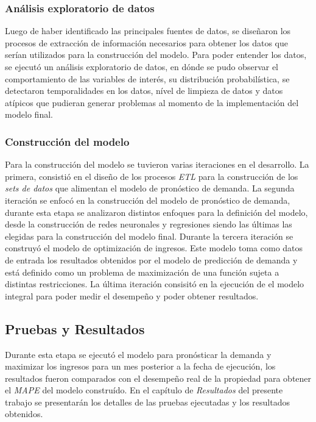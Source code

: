 \subsubsection*{Análisis exploratorio de datos}

Luego de haber identificado las principales fuentes de datos, se diseñaron los procesos de extracción de información necesarios para obtener los datos que serían utilizados para la construcción del modelo. Para poder entender los datos, se ejecutó un análisis exploratorio de datos, en dónde se pudo observar el comportamiento de las variables de interés, su distribución probabilística, se detectaron temporalidades en los datos, nível de limpieza de datos y datos atípicos que pudieran generar problemas al momento de la implementación del modelo final.

\subsubsection*{Construcción del modelo}

Para la construcción del modelo se tuvieron varias iteraciones en el desarrollo. La primera, consistió en el diseño de los procesos \emph{ETL} para la construcción de los \emph{sets de datos} que alimentan el modelo de pronóstico de demanda. La segunda iteración se enfocó en la construcción del modelo de pronóstico de demanda, durante esta etapa se analizaron distintos enfoques para la definición del modelo, desde la construcción de redes neuronales y regresiones siendo las últimas las elegidas para la construcción del modelo final. Durante la tercera iteración se construyó el modelo de optimización de ingresos. Este modelo toma como datos de entrada los resultados obtenidos por el modelo de predicción de demanda y está definido como un problema de maximización de una función sujeta a distintas restricciones. La última iteración consisitó en la ejecución de el modelo integral para poder medir el desempeño y poder obtener resultados.

\subsection*{Pruebas y Resultados}

Durante esta etapa se ejecutó el modelo para pronósticar la demanda y maximizar los ingresos para un mes posterior a la fecha de ejecución, los resultados fueron comparados con el desempeño real de la propiedad para obtener el \emph{MAPE} del modelo construído. En el capítulo de \emph{Resultados} del presente trabajo se presentarán los detalles de las pruebas ejecutadas y los resultados obtenidos.
